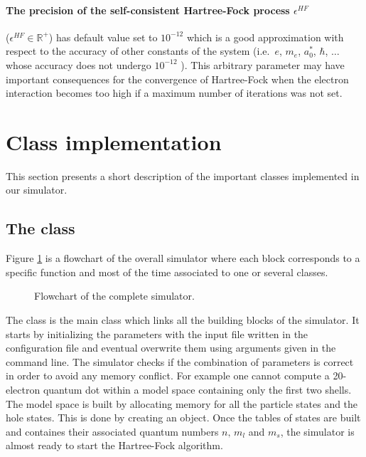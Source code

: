  \paragraph{The precision of the self-consistent Hartree-Fock process $\epsilon^{HF}$} ($\epsilon^{HF} \in\mathbb{R^+}$) has default value set to $10^{-12}$ which is a good approximation with respect to the accuracy of other constants of the system (i.e.\ $e$, $m_e$, $a_0^*$, $\hbar$, $\dots$ whose accuracy does not undergo $10^{-12}$ \cite{wiki:physConstants}). This arbitrary parameter may have important consequences for the convergence of Hartree-Fock when the electron interaction becomes too high if a maximum number of iterations was not set.



\section{Class implementation}
\label{sec:mainClasses}
This section presents a short description of the important classes implemented in our simulator.

\subsection{The  class}
Figure \ref{fig:diagramSimu} is a flowchart of the overall simulator where each block corresponds to a specific function and most of the time associated to one or several classes.
\begin{figure}
\centering
\scalebox{0.7}{}
\caption{\label{fig:diagramSimu}Flowchart of the complete simulator.}
\end{figure}
The  class is the main class which links all the building blocks of the simulator. It starts by initializing the parameters with the input file written in the configuration file  and  eventual overwrite them using arguments given in the command line.
The simulator checks if the combination of parameters is correct in order to avoid any memory conflict. For example one cannot compute a 20-electron quantum dot within a model space containing only the first two shells.
The model space is built by allocating memory for all the particle states and the hole states. This is done by creating an  object. Once the tables of states are built and containes their associated quantum numbers $n, \,m_l$ and $m_s$, the simulator is almost ready to start the Hartree-Fock algorithm. 


